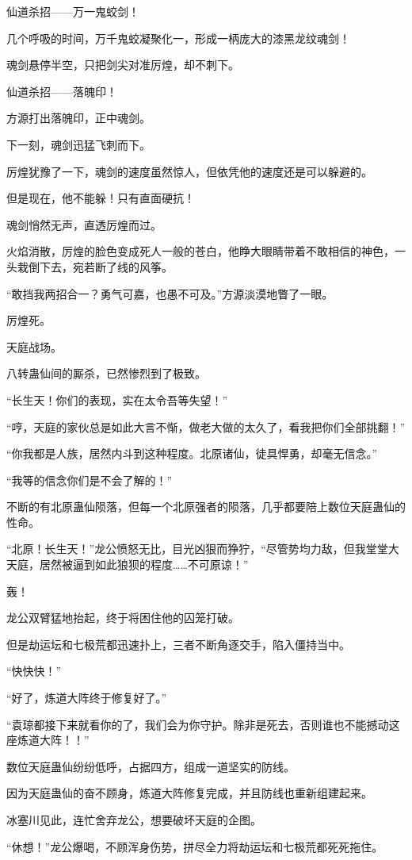 \begin{this_body}
仙道杀招——万一鬼蛟剑！

几个呼吸的时间，万千鬼蛟凝聚化一，形成一柄庞大的漆黑龙纹魂剑！

魂剑悬停半空，只把剑尖对准厉煌，却不刺下。

仙道杀招——落魄印！

方源打出落魄印，正中魂剑。

下一刻，魂剑迅猛飞刺而下。

厉煌犹豫了一下，魂剑的速度虽然惊人，但依凭他的速度还是可以躲避的。

但是现在，他不能躲！只有直面硬抗！

魂剑悄然无声，直透厉煌而过。

火焰消散，厉煌的脸色变成死人一般的苍白，他睁大眼睛带着不敢相信的神色，一头栽倒下去，宛若断了线的风筝。

“敢挡我两招合一？勇气可嘉，也愚不可及。”方源淡漠地瞥了一眼。

厉煌死。

天庭战场。

八转蛊仙间的厮杀，已然惨烈到了极致。

“长生天！你们的表现，实在太令吾等失望！”

“哼，天庭的家伙总是如此大言不惭，做老大做的太久了，看我把你们全部挑翻！”

“你我都是人族，居然内斗到这种程度。北原诸仙，徒具悍勇，却毫无信念。”

“我等的信念你们是不会了解的！”

不断的有北原蛊仙陨落，但每一个北原强者的陨落，几乎都要陪上数位天庭蛊仙的性命。

“北原！长生天！”龙公愤怒无比，目光凶狠而狰狞，“尽管势均力敌，但我堂堂大天庭，居然被逼到如此狼狈的程度……不可原谅！”

轰！

龙公双臂猛地抬起，终于将困住他的囚笼打破。

但是劫运坛和七极荒都迅速扑上，三者不断角逐交手，陷入僵持当中。

“快快快！”

“好了，炼道大阵终于修复好了。”

“袁琼都接下来就看你的了，我们会为你守护。除非是死去，否则谁也不能撼动这座炼道大阵！！”

数位天庭蛊仙纷纷低呼，占据四方，组成一道坚实的防线。

因为天庭蛊仙的奋不顾身，炼道大阵修复完成，并且防线也重新组建起来。

冰塞川见此，连忙舍弃龙公，想要破坏天庭的企图。

“休想！”龙公爆喝，不顾浑身伤势，拼尽全力将劫运坛和七极荒都死死拖住。


\end{this_body}
